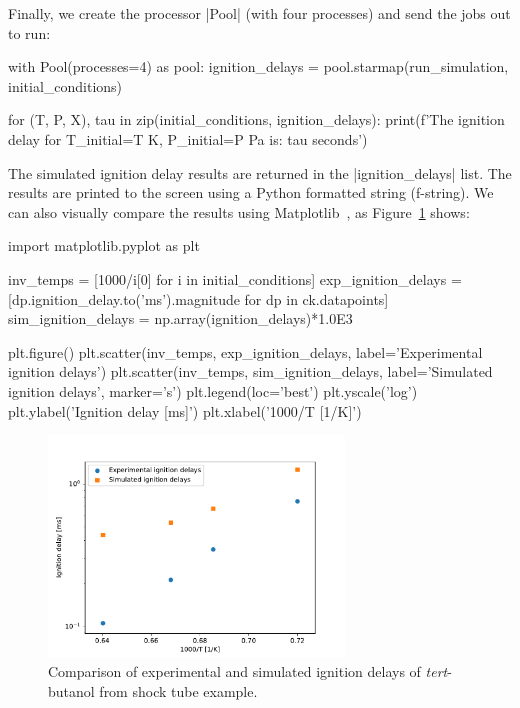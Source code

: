 \documentclass[12pt]{ijck}
\begin{document}
Finally, we create the processor \pybox|Pool| (with four processes) and send the jobs out to run:
%
\begin{pythonbox}
with Pool(processes=4) as pool:
    ignition_delays = pool.starmap(run_simulation, initial_conditions)

for (T, P, X), tau in zip(initial_conditions, ignition_delays):
    print(f'The ignition delay for T_initial={T} K, P_initial={P} Pa is: {tau} seconds')
\end{pythonbox}
%
The simulated ignition delay results are returned in the \pybox|ignition_delays| list. The results
are printed to the screen using a Python formatted string (f-string). We can also visually
compare the results using Matplotlib~\cite{matplotlib}, as
Figure~\ref{fig:ignition-delays} shows:
%
\begin{pythonbox}
import matplotlib.pyplot as plt

inv_temps = [1000/i[0] for i in initial_conditions]
exp_ignition_delays = [dp.ignition_delay.to('ms').magnitude for dp in ck.datapoints]
sim_ignition_delays = np.array(ignition_delays)*1.0E3

plt.figure()
plt.scatter(inv_temps, exp_ignition_delays, label='Experimental ignition delays')
plt.scatter(inv_temps, sim_ignition_delays, label='Simulated ignition delays', marker='s')
plt.legend(loc='best')
plt.yscale('log')
plt.ylabel('Ignition delay [ms]')
plt.xlabel('1000/T [1/K]')
\end{pythonbox}

\begin{figure}[htbp]
    \centering
    \includegraphics[width=0.7\textwidth]{ignition-delays.pdf}
    \caption{Comparison of experimental and simulated ignition delays of
    \textit{tert}-butanol from shock tube example.}
    \label{fig:ignition-delays}
\end{figure}
\end{document}
